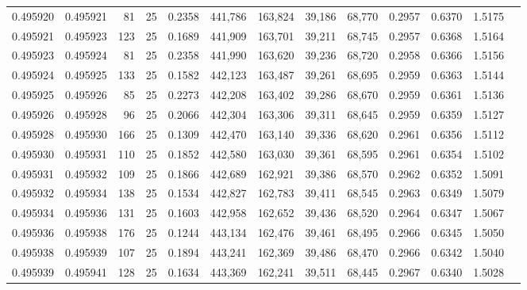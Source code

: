 \begin{tabular}{rrrrrrrrrrrrr}
0.495920 & 0.495921 &    81 &  25 &                                     0.2358 & 441,786 & 163,824 &  39,186 &  68,770 & 0.2957 & 0.6370 & 1.5175 \\
0.495921 & 0.495923 &   123 &  25 &                                     0.1689 & 441,909 & 163,701 &  39,211 &  68,745 & 0.2957 & 0.6368 & 1.5164 \\
0.495923 & 0.495924 &    81 &  25 &                                     0.2358 & 441,990 & 163,620 &  39,236 &  68,720 & 0.2958 & 0.6366 & 1.5156 \\
0.495924 & 0.495925 &   133 &  25 &                                     0.1582 & 442,123 & 163,487 &  39,261 &  68,695 & 0.2959 & 0.6363 & 1.5144 \\
0.495925 & 0.495926 &    85 &  25 &                                     0.2273 & 442,208 & 163,402 &  39,286 &  68,670 & 0.2959 & 0.6361 & 1.5136 \\
0.495926 & 0.495928 &    96 &  25 &                                     0.2066 & 442,304 & 163,306 &  39,311 &  68,645 & 0.2959 & 0.6359 & 1.5127 \\
0.495928 & 0.495930 &   166 &  25 &                                     0.1309 & 442,470 & 163,140 &  39,336 &  68,620 & 0.2961 & 0.6356 & 1.5112 \\
0.495930 & 0.495931 &   110 &  25 &                                     0.1852 & 442,580 & 163,030 &  39,361 &  68,595 & 0.2961 & 0.6354 & 1.5102 \\
0.495931 & 0.495932 &   109 &  25 &                                     0.1866 & 442,689 & 162,921 &  39,386 &  68,570 & 0.2962 & 0.6352 & 1.5091 \\
0.495932 & 0.495934 &   138 &  25 &                                     0.1534 & 442,827 & 162,783 &  39,411 &  68,545 & 0.2963 & 0.6349 & 1.5079 \\
0.495934 & 0.495936 &   131 &  25 &                                     0.1603 & 442,958 & 162,652 &  39,436 &  68,520 & 0.2964 & 0.6347 & 1.5067 \\
0.495936 & 0.495938 &   176 &  25 &                                     0.1244 & 443,134 & 162,476 &  39,461 &  68,495 & 0.2966 & 0.6345 & 1.5050 \\
0.495938 & 0.495939 &   107 &  25 &                                     0.1894 & 443,241 & 162,369 &  39,486 &  68,470 & 0.2966 & 0.6342 & 1.5040 \\
0.495939 & 0.495941 &   128 &  25 &                                     0.1634 & 443,369 & 162,241 &  39,511 &  68,445 & 0.2967 & 0.6340 & 1.5028 \\

\end{tabular}
